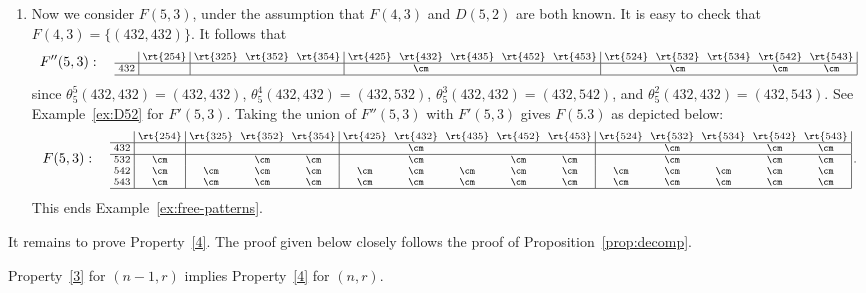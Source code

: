 \begin{exam}
\begin{enumerate}[label = (\alph*)]
\item \label{exam6.12_ii} 
Now we consider $F(5,3)$, under the assumption that $F(4,3)$ and
$D(5,2)$ are both known. It is easy to check that $F(4,3) = \{(432,
432)\}$. It follows that
 \[
 F'' (5,3): \quad
\text{\setlength{\arraycolsep}{2.7pt}\scriptsize
$\displaystyle 
\begin{array}{c|c|ccc|ccccc|ccccc|}
 &\rt{254}&\rt{325}&\rt{352}&\rt{354}%
 &\rt{425}&\rt{432}&\rt{435}&\rt{452}%
 &\rt{453}&\rt{524}&\rt{532}&\rt{534}%
 &\rt{542}&\rt{543}\\ \hline
 432 & && & &&\cm&& & &&\cm&&\cm&\cm \\ 
 \hline
\end{array}\,$}
 \]
since $\theta^5_5(432,432)=(432,432)$,
$\theta^4_5(432,432)=(432,532)$, $\theta^3_5(432,432)=(432,542)$, and
$\theta^2_5(432,432)=(432,543)$. See Example~\ref{ex:D52} for
$F'(5,3)$. Taking the union of $F''(5,3)$ with $F'(5,3)$ gives
$F(5.3)$ as depicted below:
\[
 F(5,3): \quad
\text{\setlength{\arraycolsep}{2.7pt}\scriptsize
$\displaystyle 
\begin{array}{c|c|ccc|ccccc|ccccc|}
 &\rt{254}&\rt{325}&\rt{352}&\rt{354}%
 &\rt{425}&\rt{432}&\rt{435}&\rt{452}%
 &\rt{453}&\rt{524}&\rt{532}&\rt{534}%
 &\rt{542}&\rt{543}\\ \hline
 432 & && & &&\cm&& & &&\cm&&\cm&\cm \\ \hline
 532 &\cm &&\cm&\cm &&\cm&&\cm&\cm &&\cm&&\cm&\cm \\ 
 542 &\cm &\cm&\cm&\cm &\cm&\cm&\cm&\cm&\cm &\cm&\cm&\cm&\cm&\cm \\
 543 &\cm &\cm&\cm&\cm &\cm&\cm&\cm&\cm&\cm &\cm&\cm&\cm&\cm&\cm \\ \hline
\end{array}\,.$}
\]
This ends Example~\ref{ex:free-patterns}.
\end{enumerate}
\end{exam}




It remains to prove Property~\ref{4}. The proof given below closely
follows the proof of Proposition~\ref{prop:decomp}.


\begin{prop}\label{prop:property-4}
Property~\ref{3} for $(n-1,r)$ implies Property~\ref{4} for $(n,r)$.
\end{prop}

